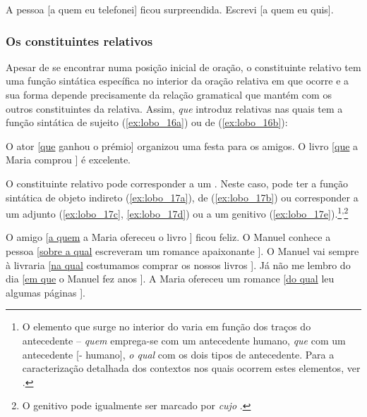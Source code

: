 \documentclass[output=paper]{LSP/langsci}
\begin{document}
\ea\label{ex:lobo_15}
\ea\label{ex:lobo_15a} A pessoa [a quem eu telefonei] ficou surpreendida.
\ex\label{ex:lobo_15b} Escrevi [a quem eu quis].
\zl

\subsubsection{Os constituintes relativos}
\label{subsubsec:lobo_cobstituintes_rel}

Apesar de se encontrar numa posição inicial de oração, o constituinte relativo tem uma função sintática específica no interior da oração relativa em que ocorre e a sua forma depende precisamente da relação gramatical que mantém com os outros constituintes da relativa. Assim, \textit{que} introduz relativas nas quais tem a função sintática de sujeito (\ref{ex:lobo_16a}) ou de  (\ref{ex:lobo_16b}):

\ea\label{ex:lobo_16}
\ea\label{ex:lobo_16a} O ator [\underline{que} \underline{\hspace{1em}} ganhou o prémio] organizou uma festa para os amigos.
\ex\label{ex:lobo_16b} O livro [\underline{que} a Maria comprou \underline{\hspace{1em}}] é excelente.
\zl\largerpage[2]

O constituinte relativo pode corresponder a um . Neste caso, pode ter a função sintática de objeto indireto (\ref{ex:lobo_17a}), de  (\ref{ex:lobo_17b}) ou corresponder a um adjunto (\ref{ex:lobo_17c}, \ref{ex:lobo_17d}) ou a um genitivo (\ref{ex:lobo_17e}).\footnote{O elemento que surge no interior do  varia em função dos traços do antecedente – \textit{quem} emprega-se com um antecedente humano, \textit{que} com um antecedente [- humano], \textit{o qual} com os dois tipos de antecedente. Para a caracterização detalhada dos contextos nos quais ocorrem estes elementos, ver \citealt{mateus_etal2003}.}\textsuperscript{,}\footnote{O genitivo pode igualmente ser marcado por \textit{cujo} \citep{mateus_etal2003}.}

\ea\label{ex:lobo_17}
\ea\label{ex:lobo_17a} O amigo [\underline{a quem} a Maria ofereceu o livro \underline{\hspace{1em}}] ficou feliz.
\ex\label{ex:lobo_17b} O Manuel conhece a pessoa [\underline{sobre a qual} escreveram um romance apaixonante \underline{\hspace{1em}}].
\ex\label{ex:lobo_17c} O Manuel vai sempre à livraria [\underline{na qual} costumamos comprar os nossos livros \underline{\hspace{1em}}].
\ex\label{ex:lobo_17d} Já não me lembro do dia [\underline{em que} o Manuel fez anos \underline{\hspace{1em}}].
\ex\label{ex:lobo_17e} A Maria ofereceu um romance [\underline{do qual} leu algumas páginas \underline{\hspace{1em}}].
\zl
\end{document}
